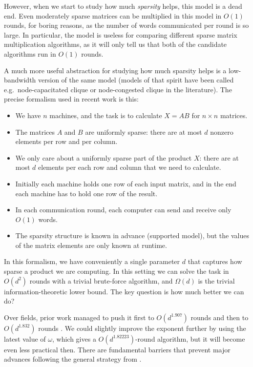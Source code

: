 However, when we start to study how much \emph{sparsity} helps, this model is a dead end. Even moderately sparse matrices can be multiplied in this model in $O(1)$ rounds, for boring reasons, as the number of words communicated per round is so large. In particular, the model is useless for comparing different sparse matrix multiplication algorithms, as it will only tell us that both of the candidate algorithms run in $O(1)$ rounds.

A much more useful abstraction for studying how much sparsity helps is a low-bandwidth version of the same model (models of that spirit have been called e.g.\ node-capacitated clique or node-congested clique in the literature). The precise formalism used in recent work \cite{gupta-hirvonen-etal-2022-sparse-matrix-multiplication,gupta-korhonen-etal-2025-low-bandwidth-matrix} is this:
\begin{itemize}
  \item We have $n$ machines, and the task is to calculate $X = AB$ for $n \times n$ matrices.
  \item The matrices $A$ and $B$ are uniformly sparse: there are at most $d$ nonzero elements per row and per column.
  \item We only care about a uniformly sparse part of the product $X$: there are at most $d$ elements per each row and column that we need to calculate.
  \item Initially each machine holds one row of each input matrix, and in the end each machine has to hold one row of the result.
  \item In each communication round, each computer can send and receive only $O(1)$ words.
  \item The sparsity structure is known in advance (supported model), but the values of the matrix elements are only known at runtime.
\end{itemize}
In this formalism, we have conveniently a single parameter $d$ that captures how sparse a product we are computing. In this setting we can solve the task in $O(d^2)$ rounds with a trivial brute-force algorithm, and $\Omega(d)$ is the trivial information-theoretic lower bound. The key question is how much better we can do?

Over fields, prior work managed to push it first to $O(d^{1.907})$ rounds \cite{gupta-hirvonen-etal-2022-sparse-matrix-multiplication} and then to $O(d^{1.832})$ rounds \cite{gupta-korhonen-etal-2025-low-bandwidth-matrix}. We could slightly improve the exponent further by using the latest value of $\omega$, which gives a $O(d^{1.82223})$-round algorithm, but it will become even less practical then. There are fundamental barriers that prevent major advances following the general strategy from \cite{gupta-hirvonen-etal-2022-sparse-matrix-multiplication,gupta-korhonen-etal-2025-low-bandwidth-matrix}.

